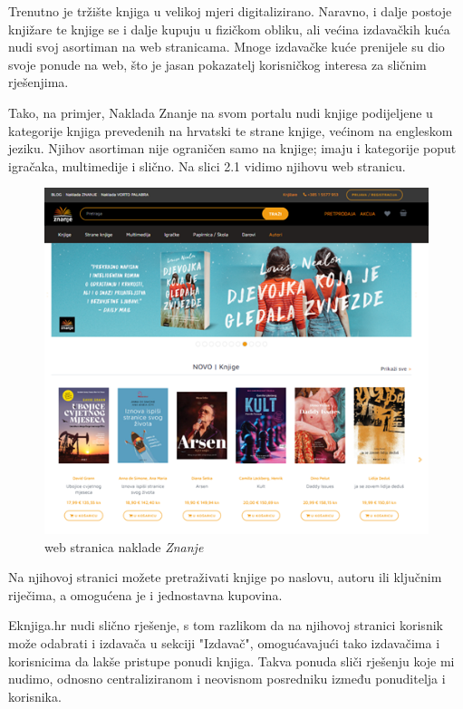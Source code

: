 		Trenutno je tržište knjiga u velikoj mjeri digitalizirano. Naravno, i dalje postoje knjižare te knjige se i dalje kupuju u fizičkom obliku, ali većina izdavačkih kuća nudi svoj asortiman na web stranicama. Mnoge izdavačke kuće prenijele su dio svoje ponude na web, što je jasan pokazatelj korisničkog interesa za sličnim rješenjima.
		
		Tako, na primjer, Naklada Znanje na svom portalu nudi knjige podijeljene u kategorije knjiga prevedenih na hrvatski te strane knjige, većinom na engleskom jeziku. Njihov asortiman nije ograničen samo na knjige; imaju i kategorije poput igračaka, multimedije i slično. Na slici 2.1 vidimo njihovu web stranicu.
		
			\begin{figure}[H]
				\includegraphics[scale=1]{slike/naklada-znanje.PNG} %
				\centering
				\caption{web stranica naklade \textit{Znanje}}
				\label{fig:Naklada Znanje}
			\end{figure}
		
		Na njihovoj stranici možete pretraživati knjige po naslovu, autoru ili ključnim riječima, a omogućena je i jednostavna kupovina.
		
		Eknjiga.hr nudi slično rješenje, s tom razlikom da na njihovoj stranici korisnik može odabrati i izdavača u sekciji "Izdavač", omogućavajući tako izdavačima i korisnicima da lakše pristupe ponudi knjiga. Takva ponuda sliči rješenju koje mi nudimo, odnosno centraliziranom i neovisnom posredniku između ponuditelja i korisnika.
		

